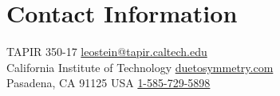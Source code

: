 \section{\sc Contact Information}
TAPIR 350-17      \hfill \href{mailto:leostein@tapir.caltech.edu}{leostein@tapir.caltech.edu}\\
California Institute of Technology   \hfill \href{http://duetosymmetry.com/}{duetosymmetry.com}\\
Pasadena, CA 91125 USA \hfill \href{tel:1-585-729-5898}{1-585-729-5898}


